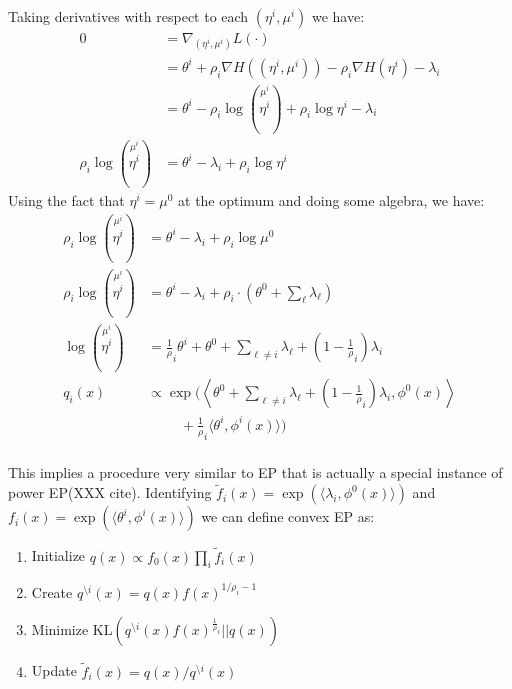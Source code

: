\documentclass[times, 10pt,twocolumn]{article}
\newcommand{\bs}[0]{\textrm{\textbackslash}}
\begin{document}
Taking derivatives with respect to each $(\eta^i,\mu^i)$ we have:
\begin{equation*}
  \begin{split}
    0 &= \nabla_{(\eta^i,\mu^i)} L(\cdot) \\
    &= \theta^i + \rho_i \nabla H\left((\eta^i,\mu^i)\right) - \rho_i \nabla
    H(\eta^i) -\lambda_i \\
    &= \theta^i  - \rho_i \log \left (\stackrel{\mu^i}{\eta^i}\right) +
  \rho_i   \log \eta^i  - \lambda_i \\
   \rho_i   \log \left (\stackrel{\mu^i}{\eta^i}\right)&= \theta^i  -
    \lambda_i + \rho_i \log \eta^i
   \end{split}
 \end{equation*}
Using the fact that $\eta^i = \mu^0$ at the optimum and doing
some algebra, we have:
\begin{equation*}
  \begin{split}
    \rho_i \log \left (\stackrel{\mu^i}{\eta^i}\right)&= \theta^i  -
    \lambda_i + \rho_i \log \mu^0 \\
    \rho_i \log \left (\stackrel{\mu^i}{\eta^i}\right)&= \theta^i  -
    \lambda_i + \rho_i \cdot ( \theta^0  + \sum_\ell \lambda_\ell) \\
    \log \left (\stackrel{\mu^i}{\eta^i}\right)&=  \frac1\rho_i
    \theta^i  + \theta^0  + \sum_{\ell \ne i} \lambda_\ell  +
    (1-\frac 1\rho_i)\lambda_i\\
    q_i(x) & \propto \exp(\left \langle \theta^0  + \sum_{\ell \ne
    i}\lambda_\ell + (1-\frac 1\rho_i)\lambda_i , \phi^0(x)
    \right\rangle\\ &\phantom{\cdots\cdots\cdots} + \frac1\rho_i \langle \theta^i,\phi^i(x)
    \rangle )\\
   \end{split}
 \end{equation*}

This implies a procedure very similar to EP that is actually a
special instance of power EP(XXX cite).  Identifying $\tilde f_i(x) =
\exp(\langle\lambda_i,\phi^0(x)\rangle)$ and $f_i(x) =
\exp(\langle\theta^i,\phi^i(x)\rangle)$ we can define convex EP as:
\begin{enumerate}
  \item Initialize $q(x) \propto f_0(x) \prod_i \tilde f_i(x)$
  \item Create $q^{\bs i}(x) = q(x)f(x)^{1/\rho_i - 1}$
  \item Minimize $\mathrm{KL}\left (q^{\bs i}(x)f(x)^{\frac1\rho_i} || q(x)\right)$
  \item Update $\tilde f_i(x) = q(x)/q^{\bs i}(x)$
\end{enumerate}
\end{document}
